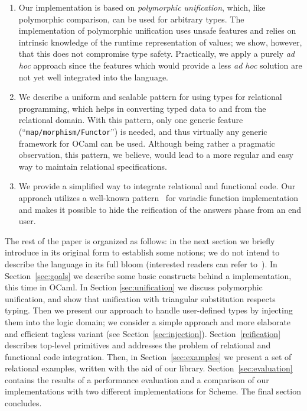 \begin{enumerate}
\item Our implementation is based on \emph{polymorphic unification}, which, like polymorphic comparison,
can be used for arbitrary types. The implementation of polymorphic unification uses unsafe features and
relies on intrinsic knowledge of the runtime representation of values; we show, however, that this does not
compromise type safety. Practically, we apply a purely \emph{ad hoc} approach since the features 
which would provide a less \emph{ad hoc} solution are not yet well integrated into the language.

\item We describe a uniform and scalable pattern for using types for relational programming, which
helps in converting typed data to and from the relational domain. With this pattern, only one
generic feature (``\lstinline{map/morphism/Functor}'') is needed, and thus virtually any generic 
framework for OCaml can be used. Although being rather a pragmatic observation, this pattern, we
believe, would lead to a more regular and easy way to maintain relational specifications.

\item We provide a simplified way to integrate relational and functional code. Our approach utilizes
a well-known pattern~\cite{Unparsing, DoWeNeed} for variadic function implementation and makes it
possible to hide the reification of the answers phase from an end user.
\end{enumerate}

The rest of the paper is organized as follows: in the next section we briefly introduce \miniKanren in
its original form to establish some notions; we do not intend to describe the language in its full bloom (interested readers can
refer to~\cite{TRS}). In Section~\ref{sec:goals} we describe some basic constructs behind a \miniKanren implementation, this time 
in OCaml. In Section \ref{sec:unification} we discuss polymorphic unification, and show that unification with 
triangular substitution respects typing. Then we present our approach to handle user-defined types by injecting them 
into the logic domain; we consider a simple approach and more elaborate and efficient tagless variant (see Section~\ref{sec:injection}). 
Section~\ref{reification} describes top-level primitives and addresses the problem of relational and functional code integration. 
Then, in Section~\ref{sec:examples} we present a set of relational examples, written with the aid of our 
library. Section~\ref{sec:evaluation} contains the results of a performance evaluation and a comparison of our implementations 
with two different implementations for Scheme. The final section concludes.

